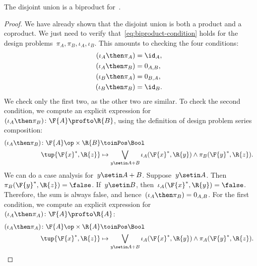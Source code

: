 \begin{lemma}
    The disjoint union is a biproduct for~\DP.
\end{lemma}
\begin{proof}
    We have already shown that the disjoint union is both a product and a coproduct.
    We just need to verify that~\cref{eq:biproduct-condition} holds for the design problems~$\pi_A, \pi_B, \iota_A, \iota_B$.
    This amounts to checking the four conditions:
    \begin{equation}
        \begin{aligned}
            (\iota_A\then \pi_A)
                                 & = \id_{A}, \\
            (\iota_A\then \pi_B) & = 0_{A,B}, \\
            (\iota_B\then \pi_A) & = 0_{B,A}, \\
            (\iota_B\then \pi_B) & = \id_{B}.
        \end{aligned}
    \end{equation}
    We check only the first two, as the other two are similar.
    To check the second condition, we compute an explicit expression for~$(\iota_A\then \pi_B)\colon \F{A} \profto \R{B}$, using the definition of design problem series composition:
    \begin{equation}
        \begin{aligned}
            (\iota_A\then \pi_B)
            \colon  \F{A}\op\times \R{B} & \toinPos \Bool \\
            \tup{\F{x}^*, \R{z}}         & \mapsto
            \bigvee_{y \setin A + B} \iota_A(\F{x}^*,\R{y}) \wedge \pi_B(\F{y}^*,\R{z}).
        \end{aligned}
    \end{equation}
    We can do a case analysis for~$y\setin A+B$.
    Suppose~$y\setin A$.
    Then~$\pi_B(\F{y}^*,\R{z}) = \false$.
    If~$y \setin B$, then~$\iota_A(\F{x}^*,\R{y}) = \false$.
    Therefore, the sum is always false, and hence~$(\iota_A\then \pi_B) = 0_{A,B}$.
    For the first condition, we compute an explicit expression for~$(\iota_A\then \pi_A) \colon \F{A} \profto \R{A}$:
    \begin{equation}
        \begin{aligned}
            (\iota_A\then \pi_A)
            \colon  \F{A}\op\times \R{A} & \toinPos \Bool \\
            \tup{\F{x}^*, \R{z}}         & \mapsto
            \bigvee_{y \setin A + B} \iota_A(\F{x}^*,\R{y}) \wedge \pi_A(\F{y}^*,\R{z}).

\end{aligned}
\end{equation}
\end{proof}
